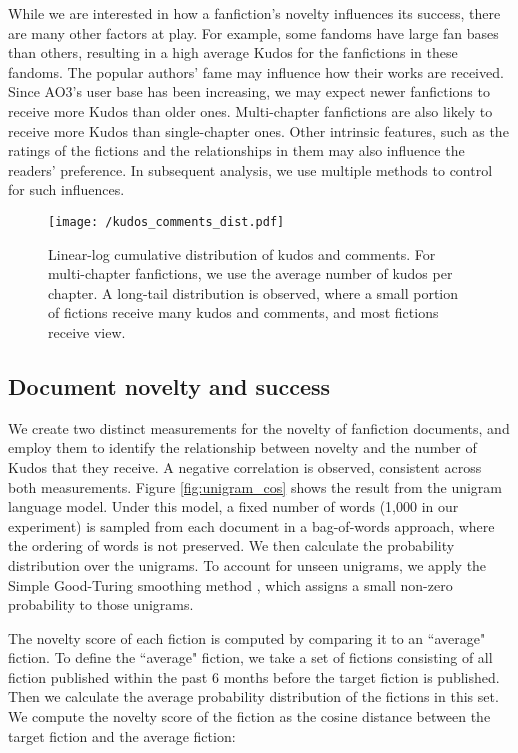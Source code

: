 \documentclass[a4paper]{article}
\begin{document}
While we are interested in how a fanfiction's novelty influences its success, there are many other factors at play. For example, some fandoms have large fan bases than others, resulting in a high average Kudos for the fanfictions in these fandoms. The popular authors' fame may influence how their works are received. Since AO3's user base has been increasing, we may expect newer fanfictions to receive more Kudos than older ones. Multi-chapter fanfictions are also likely to receive more Kudos than single-chapter ones. Other intrinsic features, such as the ratings of the fictions and the relationships in them may also influence the readers' preference. In subsequent analysis, we use multiple methods to control for such influences.

\begin{figure}
    \centering
        \texttt{[image: /kudos\_comments\_dist.pdf]}
        \caption{Linear-log cumulative distribution of kudos and comments. For multi-chapter fanfictions, we use the average number of kudos per chapter. A long-tail distribution is observed, where a small portion of fictions receive many kudos and comments, and most fictions receive view.}
        \label{fig:kudos_dist}
\end{figure}


\subsection*{Document novelty and success}
We create two distinct measurements for the novelty of fanfiction documents, and employ them to identify the relationship between novelty and the number of Kudos that they receive. A negative correlation is observed, consistent across both measurements. Figure \ref{fig:unigram_cos} shows the result from the unigram language model. Under this model, a fixed number of words (1,000 in our experiment) is sampled from each document in a bag-of-words approach, where the ordering of words is not preserved. We then calculate the probability distribution over the unigrams. To account for unseen unigrams, we apply the Simple Good-Turing smoothing method \cite{gales1995good}, which assigns a small non-zero probability to those unigrams. 

The novelty score of each fiction is computed by comparing it to an ``average" fiction. To define the ``average" fiction, we take a set of fictions consisting of all fiction published within the past 6 months before the target fiction is published. Then we calculate the average probability distribution of the fictions in this set. We compute the novelty score of the fiction as the cosine distance between the target fiction and the average fiction:
\end{document}
